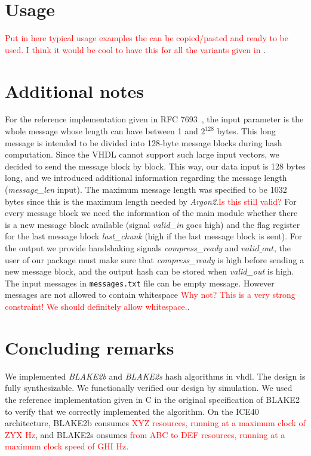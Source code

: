\documentclass[%
	a4paper,
]
{article}
\newcommand{\todo}[1]{\textcolor{red}{#1}}
\begin{document}
\section{Usage}
\label{sec:usage}

\todo{Put in here typical usage examples the can be copied/pasted and ready to be
used. I think it would be cool to have this for all the variants given in
\Cref{sec:resource-allocation}}.
%
%
\section{Additional notes}
\label{sec:additional-notes}

For the reference implementation given in RFC 7693~\autocite{rfc7693},
the input parameter is the whole message whose length can have between 1
and $2^{128}$ bytes.
%
This long message is intended to be divided into 128-byte message blocks
during hash computation. Since the VHDL cannot support such large input
vectors, we decided to send the message block by block.
%
This way, our data input is 128 bytes long, and we introduced additional
information regarding the message length (\emph{message_len} input).
%
The maximum message length was specified to be 1032 bytes since this is the
maximum length needed by \emph{Argon2}.\todo{Is this still valid?}
%
For every message block we need the information of the main module whether there
is a new message block available (signal \emph{valid_in} goes high) and the flag
register for the last message block \emph{last_chunk} (high if the last message
block is sent).
%
For the output we provide handshaking signals \emph{compress_ready}
and $valid\_out$, the user of our package must make sure that
\emph{compress_ready} is high before sending a new message block, and the
output hash can be stored when \emph{valid_out} is high.
%
The input messages in \texttt{messages.txt} file can be empty message. However
messages are not allowed to contain whitespace \todo{Why not? This is a very
strong constraint! We should definitely allow whitespace.}.
%
\section{Concluding remarks}
\label{sec:conclusding-remarks}

We implemented \emph{BLAKE2b} and \emph{BLAKE2s} hash algorithms in \gls{vhdl}.
The design is fully synthesizable. We functionally verified our design by
simulation. We used the reference implementation given in C in the original
specification of BLAKE2~\autocite{rfc7693} to verify that we correctly
implemented the algorithm. On the ICE40 architecture, BLAKE2b consumes
\todo{XYZ resources, running at a maximum clock of ZYX Hz}, and BLAKE2s
onsumes \todo{from ABC to DEF resources, running at a maximum clock speed of
GHI Hz}.
%
%
%
\printbibliography
%
%
\end{document}
